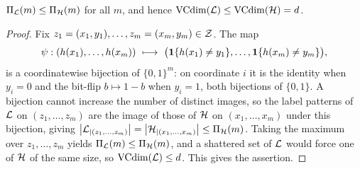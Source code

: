 \begin{fact}\label{fac:loss-vc}
$\Pi_{\mathcal{L}}(m)\le\Pi_{\mathcal{H}}(m)$ for all $m$, and hence
$\operatorname{VCdim}(\mathcal{L})\le\operatorname{VCdim}(\mathcal{H})=d$.
\end{fact}

\begin{proof}
Fix $z_1=(x_1,y_1),\dots,z_m=(x_m,y_m)\in\mathcal{Z}$. The map
\begin{align*}
\psi:(h(x_1),\dots,h(x_m))\ \longmapsto\
\bigl(\mathbf{1}\{h(x_1)\neq y_1\},\dots,\mathbf{1}\{h(x_m)\neq y_m\}\bigr),
\end{align*}
is a coordinatewise bijection of $\{0,1\}^{m}$: on coordinate $i$ it is the
identity when $y_i=0$ and the bit-flip $b\mapsto 1-b$ when $y_i=1$, both
bijections of $\{0,1\}$. A bijection cannot increase the number of distinct
images, so the label patterns of $\mathcal{L}$ on $(z_1,\dots,z_m)$ are the image of
those of $\mathcal{H}$ on $(x_1,\dots,x_m)$ under this bijection, giving
$\left| \mathcal{L}_{|(z_1,\dots,z_m)} \right|=\left| \mathcal{H}_{|(x_1,\dots,x_m)} \right|
\le\Pi_{\mathcal{H}}(m)$. Taking the maximum over $z_1,\dots,z_m$ yields
$\Pi_{\mathcal{L}}(m)\le\Pi_{\mathcal{H}}(m)$, and a shattered set of $\mathcal{L}$ would
force one of $\mathcal{H}$ of the same size, so $\operatorname{VCdim}(\mathcal{L})\le d$. This gives the
assertion.
\end{proof}
